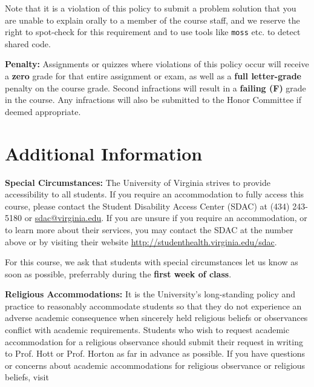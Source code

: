 \documentclass[12pt]{article}
\begin{document}
Note that it is a violation of this policy to submit a problem solution that you are unable to explain orally to a member of the course staff, and we reserve the right to spot-check for this requirement and to use tools like {\tt moss} etc. to detect shared code.

\textbf{Penalty:} Assignments or quizzes where violations of this policy occur will receive a \textbf{zero} grade for that entire assignment or exam, as well as a \textbf{full letter-grade} penalty on the course grade.  Second infractions will result in a \textbf{failing (F)} grade in the course.  Any infractions will also be submitted to the Honor Committee if deemed appropriate.

\section*{Additional Information}


\textbf{Special Circumstances:} The University of Virginia strives to provide accessibility to all students. If you require an accommodation to fully access this course, please contact the Student Disability Access Center (SDAC) at (434) 243-5180 or \url{sdac@virginia.edu}. If you are unsure if you require an accommodation, or to learn more about their services, you may contact the SDAC at the number above or by visiting their website \url{http://studenthealth.virginia.edu/sdac}.

For this course, we ask that students with special circumstances let us know as soon as possible, preferrably during the \textbf{first week of class}.

\textbf{Religious Accommodations:} It is the University's long-standing policy and practice to reasonably accommodate students so that they do not experience an adverse academic consequence when sincerely held religious beliefs or observances conflict with academic requirements.  Students who wish to request academic accommodation for a religious observance should submit their request in writing to Prof. Hott or Prof. Horton as far in advance as possible. If you have questions or concerns about academic accommodations for religious observance or religious beliefs, visit 
\end{document}
